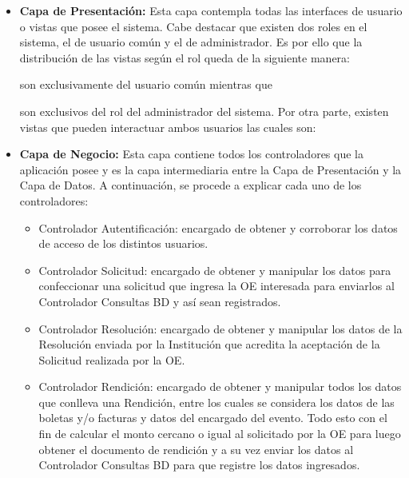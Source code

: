 \begin{itemize}
    \item \textbf{Capa de Presentación: } Esta capa contempla todas las interfaces de usuario o vistas que posee el sistema. Cabe destacar que existen dos roles en el sistema, el de usuario común y el de administrador. Es por ello que la distribución de las vistas según el rol queda de la siguiente manera:
      son exclusivamente del usuario común mientras que 
      son exclusivos del rol del administrador del sistema. Por otra parte, existen vistas que pueden interactuar ambos usuarios las cuales son: 
    \item \textbf{Capa de Negocio: }Esta capa contiene todos los controladores que la aplicación posee y es la capa intermediaria entre la Capa de Presentación y la Capa de Datos. A continuación, se procede a explicar cada uno de los controladores:
        \begin{itemize}
            \item Controlador Autentificación: encargado de obtener y corroborar los datos de acceso de los distintos usuarios.
            \item Controlador Solicitud: encargado de obtener y manipular los datos para confeccionar una solicitud que ingresa la OE interesada para enviarlos al Controlador Consultas BD y así sean registrados.
            \item Controlador Resolución: encargado de obtener y manipular los datos de la Resolución enviada por la Institución que acredita la aceptación de la Solicitud realizada por la OE.
            \item Controlador Rendición: encargado de obtener y manipular todos los datos que conlleva una Rendición, entre los cuales se considera los datos de las boletas y/o facturas y datos del encargado del evento. Todo esto con el fin de calcular el monto cercano o igual al solicitado por la OE para luego obtener el documento de rendición y a su vez enviar los datos al Controlador Consultas BD para que registre los datos ingresados.

\end{itemize}
\end{itemize}
